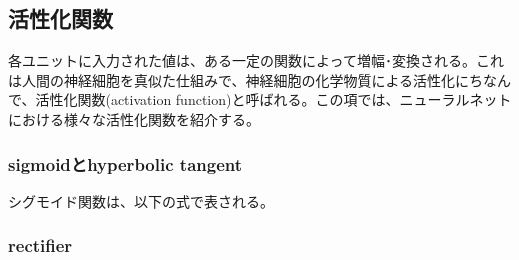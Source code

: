 \subsection{活性化関数}
各ユニットに入力された値は、ある一定の関数によって増幅･変換される。これは人間の神経細胞を真似た仕組みで、神経細胞の化学物質による活性化にちなんで、活性化関数(activation function)と呼ばれる。この項では、ニューラルネットにおける様々な活性化関数を紹介する。
\subsubsection{sigmoidとhyperbolic tangent}
シグモイド関数は、以下の式で表される。

\subsubsection{rectifier}
